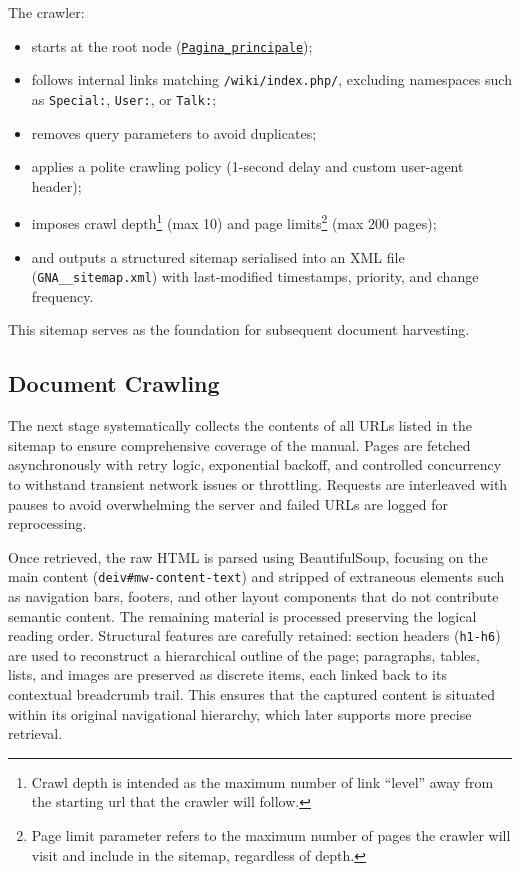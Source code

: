 \begin{spacing}{1.5}
The crawler:
\begin{itemize}
      \item starts at the root node (\texttt{\href{https://web.archive.org/web/20250803092155/https://gna.cultura.gov.it/wiki/index.php/Pagina_principale}{Pagina\_principale}}\nocite{noauthor_wiki_2025});
      \item follows internal links matching \texttt{/wiki/index.php/}, excluding namespaces such as \texttt{Special:}, \texttt{User:}, or \texttt{Talk:};
      \item removes query parameters to avoid duplicates;
      \item applies a polite crawling policy (1-second delay and custom user-agent header);
      \item imposes crawl depth\footnote{Crawl depth is intended as the maximum number of link ``level'' away from the starting url that the crawler will follow.} (max 10) and page limits\footnote{Page limit parameter refers to the maximum number of pages the crawler will visit and include in the sitemap, regardless of depth.} (max 200 pages);
      \item and outputs a structured sitemap serialised into an XML file (\texttt{GNA\_\_sitemap.xml}) with last-modified timestamps, priority, and change frequency. 
\end{itemize}

This sitemap serves as the foundation for subsequent document harvesting.

\subsection{Document Crawling}
The next stage systematically collects the contents of all URLs listed in the sitemap to ensure comprehensive coverage of the manual. Pages are fetched asynchronously with retry logic, exponential backoff, and controlled concurrency to withstand transient network issues or throttling. Requests are interleaved with pauses to avoid overwhelming the server and failed URLs are logged for reprocessing.

Once retrieved, the raw HTML is parsed using BeautifulSoup, focusing on the main content (\texttt{deiv\#mw-content-text}) and stripped of extraneous elements such as navigation bars, footers, and other layout components that do not contribute semantic content. The remaining material is processed preserving the logical reading order. Structural features are carefully retained: section headers (\texttt{h1-h6}) are used to reconstruct a hierarchical outline of the page; paragraphs, tables, lists, and images are preserved as discrete items, each linked back to its contextual breadcrumb trail. This ensures that the captured content is situated within its original navigational hierarchy, which later supports more precise retrieval.


\end{spacing}
